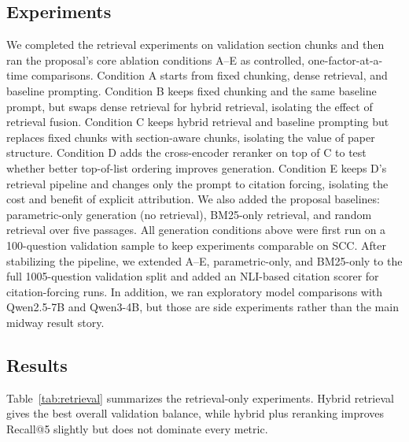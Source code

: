 \documentclass[11pt]{article}
\begin{document}
\subsection{Experiments}

We completed the retrieval experiments on validation section chunks and then ran the proposal's core ablation conditions A--E as controlled, one-factor-at-a-time comparisons. Condition A starts from fixed chunking, dense retrieval, and baseline prompting. Condition B keeps fixed chunking and the same baseline prompt, but swaps dense retrieval for hybrid retrieval, isolating the effect of retrieval fusion. Condition C keeps hybrid retrieval and baseline prompting but replaces fixed chunks with section-aware chunks, isolating the value of paper structure. Condition D adds the cross-encoder reranker on top of C to test whether better top-of-list ordering improves generation. Condition E keeps D's retrieval pipeline and changes only the prompt to citation forcing, isolating the cost and benefit of explicit attribution. We also added the proposal baselines: parametric-only generation (no retrieval), BM25-only retrieval, and random retrieval over five passages. All generation conditions above were first run on a 100-question validation sample to keep experiments comparable on SCC. After stabilizing the pipeline, we extended A--E, parametric-only, and BM25-only to the full 1005-question validation split and added an NLI-based citation scorer for citation-forcing runs. In addition, we ran exploratory model comparisons with Qwen2.5-7B and Qwen3-4B, but those are side experiments rather than the main midway result story.

\subsection{Results}

Table~\ref{tab:retrieval} summarizes the retrieval-only experiments. Hybrid retrieval gives the best overall validation balance, while hybrid plus reranking improves Recall@5 slightly but does not dominate every metric.

\begin{table}[H]
\centering
\small
{}
\caption{Validation retrieval results on section-aware chunks.}
\label{tab:retrieval}
\end{table}
\end{document}
